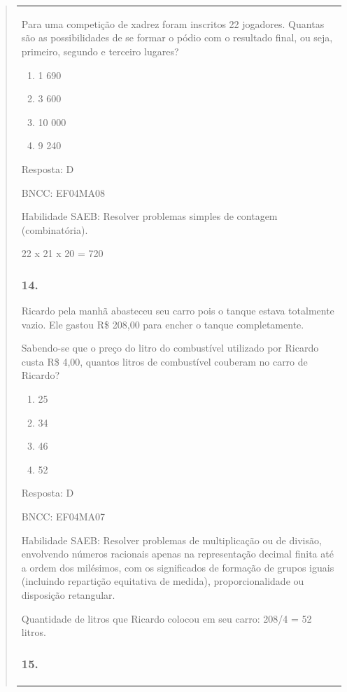 \begin{enumerate}
\begin{escolha}
\begin{enumerate}
\begin{itemize}
\begin{itemize}
\begin{escolha}
\begin{quote}
\begin{escolha}
{\begin{longtable}[]{@{}l@{}}
\begin{itemize}
Para uma competição de xadrez foram inscritos 22 jogadores. Quantas são
as possibilidades de se formar o pódio com o resultado final, ou seja,
primeiro, segundo e terceiro lugares?

\begin{enumerate}
\def\labelenumi{\alph{enumi})}
\item
  1 690
\item
  3 600
\item
  10 000
\item
  9 240
\end{enumerate}

Resposta: D

BNCC: EF04MA08

Habilidade SAEB: Resolver problemas simples de contagem (combinatória).

22 x 21 x 20 = 720

\subsubsection{14.}\label{section-170}

Ricardo pela manhã abasteceu seu carro pois o tanque estava totalmente
vazio. Ele gastou R\$ 208,00 para encher o tanque completamente.

Sabendo-se que o preço do litro do combustível utilizado por Ricardo
custa R\$ 4,00, quantos litros de combustível couberam no carro de
Ricardo?

\begin{enumerate}
\def\labelenumi{\alph{enumi})}
\item
  25
\item
  34
\item
  46
\item
  52
\end{enumerate}

Resposta: D

BNCC: EF04MA07

Habilidade SAEB: Resolver problemas de multiplicação ou de divisão,
envolvendo números racionais apenas na representação decimal finita até
a ordem dos milésimos, com os significados de formação de grupos iguais
(incluindo repartição equitativa de medida), proporcionalidade ou
disposição retangular.

Quantidade de litros que Ricardo colocou em seu carro: 208/4 = 52
litros.

\subsubsection{15.}\label{section-171}


\end{itemize}
\end{longtable}}
\end{escolha}
\end{quote}
\end{escolha}
\end{itemize}
\end{itemize}
\end{enumerate}
\end{escolha}
\end{enumerate}
